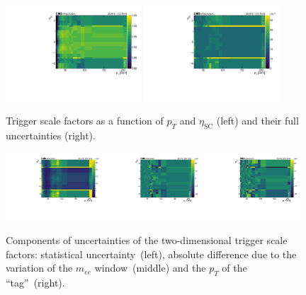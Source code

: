 \begin{figure}
\centering
\includegraphics[width=0.45\textwidth]{fig/chapt7/trigger_eff/sf2d_nominal}
\includegraphics[width=0.45\textwidth]{fig/chapt7/trigger_eff/sf2d_fullError}
\caption{Trigger scale factors as a function of $p_{T}$ and $\eta_\text{SC}$ (left) and their full uncertainties (right).}
\label{Fig:TnP2DSF}
\end{figure}

\begin{figure}
  \centering
  \includegraphics[width=0.32\textwidth]{fig/chapt7/trigger_eff/sf2d_statError}
  \includegraphics[width=0.32\textwidth]{fig/chapt7/trigger_eff/sf2d_diffMassWindow}
  \includegraphics[width=0.32\textwidth]{fig/chapt7/trigger_eff/sf2d_diffTagPt}
  \caption{Components of uncertainties of the two-dimensional trigger scale factors: statistical uncertainty~(left), absolute difference due to the variation of the $m_{ee}$ window~(middle) and the $p_{T}$ of the ``tag''~(right).}
  \label{Fig:TnP2DSFUnc}
\end{figure}

